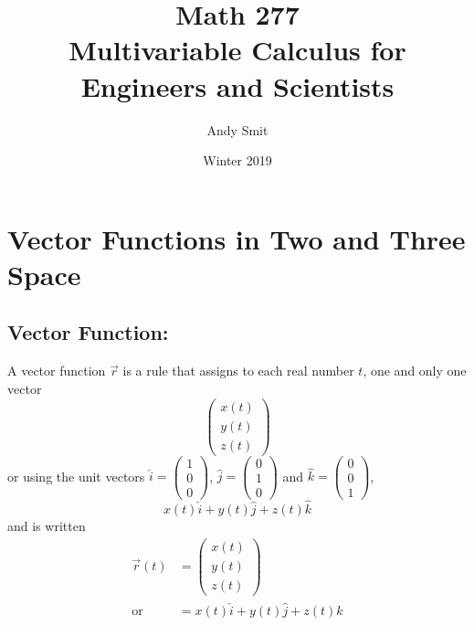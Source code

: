 \documentclass[14pt]{article}
\title{Math 277\\Multivariable Calculus for Engineers and Scientists}
\author{Andy Smit}
\date{Winter 2019}
\begin{document}
    \maketitle
    \section{Vector Functions in Two and Three Space}
    \subsection{Vector Function: }
    A vector function $\vec{r}$ is a rule that assigns to each real number $t$, one and only one vector 
    $$\begin{pmatrix}x(t)\\  y(t)\\ z(t)\end{pmatrix}$$
    or using the unit vectors $\hat{i}=\left(\begin{smallmatrix}1\\0\\0\end{smallmatrix}\right)$, $\hat{j}=\left(\begin{smallmatrix}0\\1\\0\end{smallmatrix}\right)$ and $\hat{k}=\left(\begin{smallmatrix}0\\0\\1\end{smallmatrix}\right)$,  
    $$x(t)\hat{i}+y(t)\hat{j}+z(t)\hat{k}$$
    and is written 
    \[
        \begin{split}
            \vec{r}(t) &= \begin{pmatrix}x(t)\\y(t)\\z(t)\end{pmatrix}\\ 
            \text{or\ } &= x(t)\hat{i}+y(t)\hat{j}+z(t)\hat{k}
        \end{split}
    \]
\end{document}
